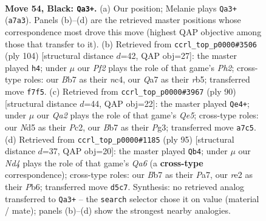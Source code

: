 \documentclass[11pt]{article}
\begin{document}
\clearpage

\begin{figure}[p]\centering
\begin{subfigure}{0.46\textwidth}\centering
\resizebox{\linewidth}{!}{%
\newchessgame
\chessboard[
  setfen={8/qb3pk1/6p1/3n4/3R3P/3K4/4R2P/5N2 b - - 16 54},
  showmover=false,
  pgfstyle=straightmove, color=movearrow, markmove={a7-a3}
]}
\caption{}
\end{subfigure}\hfill
\begin{subfigure}{0.46\textwidth}\centering
\resizebox{\linewidth}{!}{%
\newchessgame
\chessboard[
  setfen={3R4/6pk/1p5p/1r1N4/2n5/5P2/6PP/6K1 w - - 4 53},
  showmover=false,
  pgfstyle=straightmove, color=movearrow, markmove={h2-h4}
]}
\caption{}
\end{subfigure}
\\[4pt]
\begin{subfigure}{0.46\textwidth}\centering
\resizebox{\linewidth}{!}{%
\newchessgame
\chessboard[
  setfen={3r4/1kr4p/p3p3/4Q3/8/6P1/P1P4P/7K w - - 0 46},
  showmover=false,
  pgfstyle=straightmove, color=movearrow, markmove={e5-e4}
]}
\caption{}
\end{subfigure}\hfill
\begin{subfigure}{0.46\textwidth}\centering
\resizebox{\linewidth}{!}{%
\newchessgame
\chessboard[
  setfen={8/p5k1/1p5p/1P4p1/8/q2R4/6PP/3R3K b - - 9 48},
  showmover=false,
  pgfstyle=straightmove, color=movearrow, markmove={a3-b4}
]}
\caption{}
\end{subfigure}
\caption{\textbf{Move 54, Black: \texttt{Qa3+}.} (a) Our position; Melanie plays \texttt{Qa3+} (\texttt{a7a3}). Panels (b)--(d) are the retrieved master positions whose correspondence most drove this move (highest QAP objective among those that transfer to it). (b) Retrieved from \texttt{ccrl\_top\_p0000\#3506} (ply 104) [structural distance $d$=42, QAP obj=27]: the master played \texttt{h4}; under $\mu$ our \emph{Pf2} plays the role of that game's \emph{Ph2}; cross-type roles: our \emph{B}b7 as their \emph{n}c4, our \emph{Q}a7 as their \emph{r}b5; transferred move \texttt{f7f5}. (c) Retrieved from \texttt{ccrl\_top\_p0000\#3967} (ply 90) [structural distance $d$=44, QAP obj=22]: the master played \texttt{Qe4+}; under $\mu$ our \emph{Qa2} plays the role of that game's \emph{Qe5}; cross-type roles: our \emph{N}d5 as their \emph{P}c2, our \emph{B}b7 as their \emph{P}g3; transferred move \texttt{a7c5}. (d) Retrieved from \texttt{ccrl\_top\_p0000\#1185} (ply 95) [structural distance $d$=37, QAP obj=20]: the master played \texttt{Qb4}; under $\mu$ our \emph{Nd4} plays the role of that game's \emph{Qa6} (a \textbf{cross-type} correspondence); cross-type roles: our \emph{B}b7 as their \emph{P}a7, our \emph{r}e2 as their \emph{P}b6; transferred move \texttt{d5c7}. Synthesis: no retrieved analog transferred to \texttt{Qa3+} -- the \texttt{search} selector chose it on value (material / mate); panels (b)--(d) show the strongest nearby analogies.}
\label{fig:thought-m107}
\end{figure}
\end{document}
